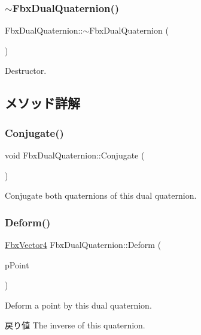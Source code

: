 \subsubsection{\texorpdfstring{$\sim$\+Fbx\+Dual\+Quaternion()}{~FbxDualQuaternion()}}
{\footnotesize\ttfamily Fbx\+Dual\+Quaternion\+::$\sim$\+Fbx\+Dual\+Quaternion (\begin{DoxyParamCaption}{ }\end{DoxyParamCaption})}



Destructor. 



\subsection{メソッド詳解}
\mbox{\label{class_fbx_dual_quaternion_a4b868a1951c6c4bdf81d30acbc5dec87}} 
\subsubsection{\texorpdfstring{Conjugate()}{Conjugate()}}
{\footnotesize\ttfamily void Fbx\+Dual\+Quaternion\+::\+Conjugate (\begin{DoxyParamCaption}{ }\end{DoxyParamCaption})}

Conjugate both quaternions of this dual quaternion. \mbox{\label{class_fbx_dual_quaternion_a9a3380796ebd7bdcdc0c3f7363181b0f}} 
\subsubsection{\texorpdfstring{Deform()}{Deform()}}
{\footnotesize\ttfamily \hyperlink{class_fbx_vector4}{Fbx\+Vector4} Fbx\+Dual\+Quaternion\+::\+Deform (\begin{DoxyParamCaption}\item[{\hyperlink{class_fbx_vector4}{Fbx\+Vector4} \&}]{p\+Point }\end{DoxyParamCaption})}

Deform a point by this dual quaternion. \begin{DoxyReturn}{戻り値}
The inverse of this quaternion. 
\end{DoxyReturn}
\mbox{\label{class_fbx_dual_quaternion_ac932bf84d0cf5a6e397de55fdde914a6}} 
